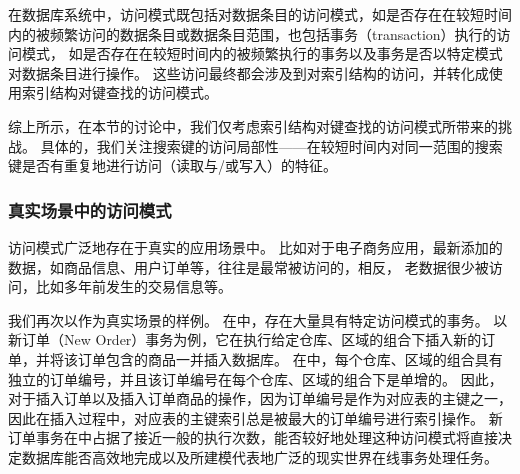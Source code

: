 
在数据库系统中，访问模式既包括对数据条目的访问模式，如是否存在在较短时间内的被频繁访问的数据条目或数据条目范围，也包括事务（transaction）执行的访问模式，
如是否存在在较短时间内的被频繁执行的事务以及事务是否以特定模式对数据条目进行操作。
这些访问最终都会涉及到对索引结构的访问，并转化成使用索引结构对键查找的访问模式。

综上所示，在本节的讨论中，我们仅考虑索引结构对键查找的访问模式所带来的挑战。
具体的，我们关注搜索键的访问局部性{------}在较短时间内对同一范围的搜索键是否有重复地进行访问（读取与/或写入）的特征。

\subsubsection{真实场景中的访问模式}

访问模式广泛地存在于真实的应用场景中。
比如对于电子商务应用，最新添加的数据，如商品信息、用户订单等，往往是最常被访问的，相反，
老数据很少被访问，比如多年前发生的交易信息等。

我们再次以{\tpcc}作为真实场景的样例。
在{\tpcc}中，存在大量具有特定访问模式的事务。
以新订单（New Order）事务为例，它在执行给定仓库、区域的组合下插入新的订单，并将该订单包含的商品一并插入数据库。
在{\tpcc}中，每个仓库、区域的组合具有独立的订单编号，并且该订单编号在每个仓库、区域的组合下是单增的。
因此，对于插入订单以及插入订单商品的操作，因为订单编号是作为对应表的主键之一，因此在插入过程中，对应表的主键索引总是被最大的订单编号进行索引操作。
新订单事务在{\tpcc}中占据了接近一般的执行次数，能否较好地处理这种访问模式将直接决定数据库能否高效地完成{\tpcc}以及{\tpcc}所建模代表地广泛的现实世界在线事务处理任务。


